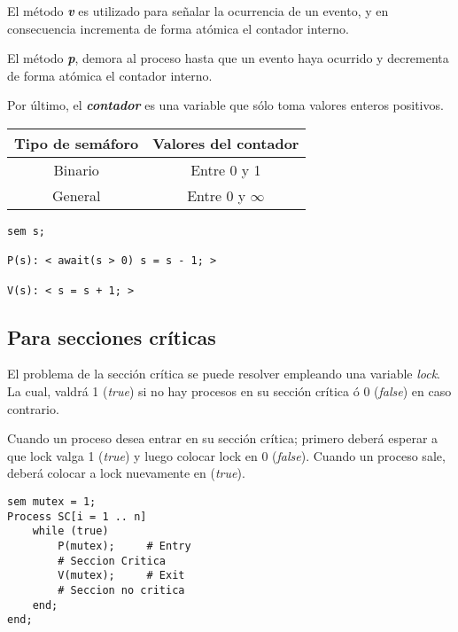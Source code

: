 \documentclass[a4paper, 10pt]{report}
\begin{document}
El método \textbf{\emph{v}} es utilizado para señalar la ocurrencia de un evento, y en consecuencia incrementa de forma atómica el contador interno.

El método \textbf{\emph{p}}, demora al proceso hasta que un evento haya ocurrido y decrementa de forma atómica el contador interno.

Por último, el \textbf{\emph{contador}} es una variable que sólo toma valores enteros positivos.



\begin{multicols}{2}

    {\renewcommand{\arraystretch}{2}%
    \centering
    \begin{tabular}{cc}
        \textbf{Tipo de semáforo} & \textbf{Valores del contador}\\
        \hline 
        Binario & Entre 0 y 1\\ 
        General & Entre 0 y $\infty$\\ 
    \end{tabular}}

\begin{lstlisting}
sem s;

P(s): < await(s > 0) s = s - 1; >

V(s): < s = s + 1; >
\end{lstlisting}

\columnbreak


    
\end{multicols}




\subsection{Para secciones críticas}

El problema de la sección crítica se puede resolver empleando una variable \emph{lock}. La cual, valdrá 1 (\emph{true}) si no hay procesos en su sección crítica ó 0 (\emph{false}) en caso contrario.

Cuando un proceso desea entrar en su sección crítica; primero deberá esperar a que lock valga 1 (\emph{true}) y luego colocar lock en 0 (\emph{false}). Cuando un proceso sale, deberá colocar a lock nuevamente en (\emph{true}).

\begin{lstlisting}
sem mutex = 1;
Process SC[i = 1 .. n]
    while (true)
        P(mutex);     # Entry
        # Seccion Critica
        V(mutex);     # Exit
        # Seccion no critica
    end;
end;
\end{lstlisting}
\end{document}
